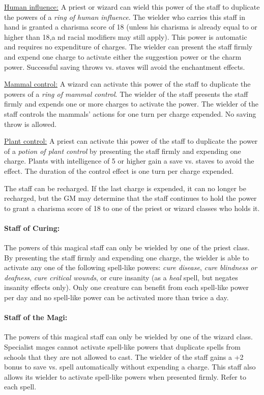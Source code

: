 \begin{multicols}{2}
\underline{Human influence:} A priest or wizard can wield this power of the staff to duplicate the powers of a \textit{ring of human influence}.  The wielder who carries this staff in hand is granted a charisma score of 18 (unless his charisma is already equal to or higher than 18,a nd racial modifiers may still apply).  This power is automatic and requires no expenditure of charges.  The wielder can present the staff firmly and expend one charge to activate either the suggestion power or the charm power.  Successful saving throws vs. staves will avoid the enchantment effects.

\underline{Mammal control:} A wizard can activate this power of the staff to duplicate the powers of a \textit{ring of mammal control}.  The wielder of the staff presents the staff firmly and expends one or more charges to activate the power.  The wielder of the staff controls the mammals' actions for one turn per charge expended.  No saving throw is allowed.

\underline{Plant control:} A priest can activate this power of the staff to duplicate the power of a \textit{potion of plant control} by presenting the staff firmly and expending one charge. Plants with intelligence of 5 or higher gain a save vs. staves to avoid the effect.  The duration of the control effect is one turn per charge expended.

The staff can be recharged.  If the last charge is expended, it can no longer be recharged, but the GM may determine that the staff continues to hold the power to grant a charisma score of 18 to one of the priest or wizard classes who holds it.

\paragraph{Staff of Curing:} The powers of this magical staff can only be wielded by one of the priest class.  By presenting the staff firmly and expending one charge, the wielder is able to activate any one of the following spell-like powers: \textit{cure disease}, \textit{cure blindness or deafness}, \textit{cure critical wounds}, or cure insanity (as a \textit{heal} spell, but negates insanity effects only).  Only one creature can benefit from each spell-like power per day and no spell-like power can be activated more than twice a day.

\paragraph{Staff of the Magi:} The powers of this magical staff can only be wielded by one of the wizard class.  Specialist mages cannot activate spell-like powers that duplicate spells from schools that they are not allowed to cast.  The wielder of the staff gains a +2 bonus to save vs. spell automatically without expending a charge.  This staff also allows its wielder to activate spell-like powers when presented firmly.  Refer to each spell.


\end{multicols}

